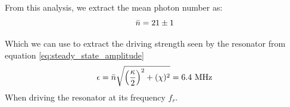 From this analysis, we extract the mean photon number as:
\begin{equation}
    \Bar{n} = 21 \pm 1
\end{equation}

Which we can use to extract the driving strength seen by the resonator from equation \ref{eq:steady_state_amplitude}
\begin{equation}
    \epsilon = \Bar{n} \sqrt{\left(\frac{\kappa}{2}\right)^2 + (\chi)^2} = 6.4 \text{ MHz}
\end{equation}
When driving the resonator at its frequency $f_r$.













